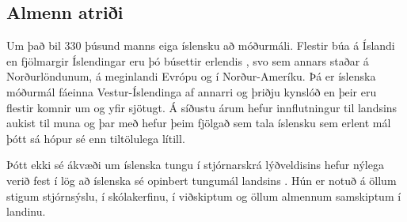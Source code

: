 \documentclass{../../metanetpaper}
\begin{document}
\begin{multicols}{2}

\subsection{Almenn atriði}

Um það bil 330 þúsund manns eiga íslensku að móðurmáli. Flestir búa á Íslandi \cite{hag1}  en fjölmargir Íslendingar eru þó búsettir erlendis \cite{vis1},  svo sem annars staðar á Norðurlöndunum, á meginlandi Evrópu og í Norður-Ameríku. Þá er íslenska móðurmál fáeinna Vestur-Íslendinga af annarri og þriðju kynslóð \cite{can1}  en þeir eru flestir komnir um og yfir sjötugt. Á síðustu árum hefur innflutningur til landsins aukist til muna og þar með hefur þeim fjölgað sem tala íslensku sem erlent mál þótt sá hópur sé enn tiltölulega lítill.


Þótt ekki sé ákvæði um íslenska tungu í stjórnarskrá lýðveldisins hefur nýlega verið fest í lög að íslenska sé opinbert tungumál landsins \cite{alt1}. Hún er notuð á öllum stigum stjórnsýslu, í skólakerfinu, í viðskiptum og öllum almennum samskiptum í landinu. 


\end{multicols}
\end{document}

